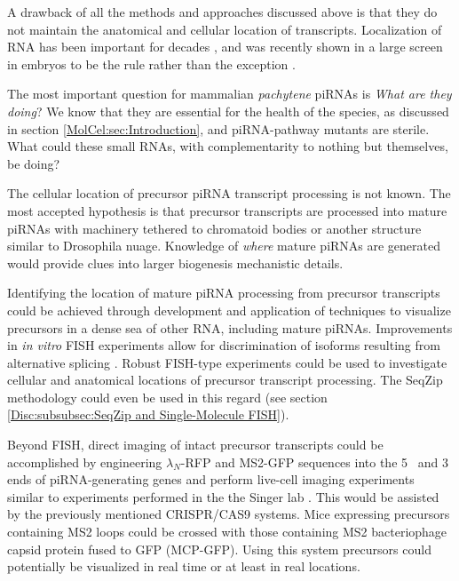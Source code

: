     A drawback of all the methods and approaches discussed above is that they do not maintain the anatomical and cellular location of transcripts. Localization of RNA has been important for decades \citep{Rebagliati1985}, and was recently shown in a large screen in \flies{} embryos to be the rule rather than the exception \citep{Lecuyer2007}.

    The most important question for mammalian \textit{pachytene} piRNAs is \textit{What are they doing}? We know that they are essential for the health of the species, as discussed in section \ref{MolCel:sec:Introduction}, and piRNA-pathway mutants are sterile. What could these small RNAs, with complementarity to nothing but themselves, be doing? 

    The cellular location of precursor piRNA transcript processing is not known. The most accepted hypothesis is that precursor transcripts are processed into mature piRNAs with machinery tethered to chromatoid bodies \citep{Meikar2011,Meikar2014} or another structure similar to Drosophila nuage. Knowledge of \textit{where} mature piRNAs are generated would provide clues into larger biogenesis mechanistic details.

    Identifying the location of mature piRNA processing from precursor transcripts could be achieved through development and application of techniques to visualize precursors in a dense sea of other RNA, including mature piRNAs. Improvements in \textit{in vitro} FISH experiments allow for discrimination of isoforms resulting from alternative splicing \citep{Lee2014}. Robust FISH-type experiments could be used to investigate cellular and anatomical locations of precursor transcript processing. The SeqZip methodology could even be used in this regard (see section \ref{Disc:subsubsec:SeqZip and Single-Molecule FISH}).

    Beyond FISH, direct imaging of intact precursor transcripts could be accomplished by engineering $\lambda_{N}$-RFP \citep{Daigle2007} and MS2-GFP sequences into the 5\textprime~ and 3\textprime~ ends of piRNA-generating genes and perform live-cell imaging experiments similar to experiments performed in the the Singer lab \citep{Park2014}. This would be assisted by the previously mentioned CRISPR/CAS9 systems. Mice expressing precursors containing MS2 loops could be crossed with those containing MS2 bacteriophage capsid protein fused to GFP (MCP-GFP). Using this system precursors could potentially be visualized in real time or at least in real locations.

